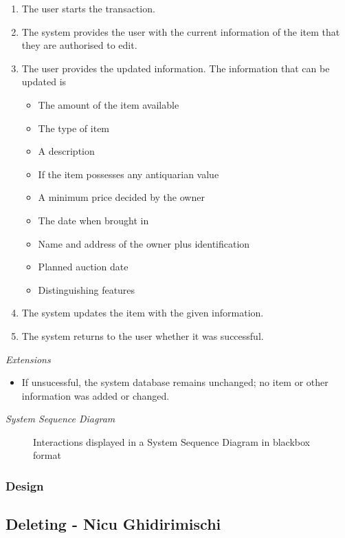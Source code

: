 \documentclass{article}
\begin{document}
\begin{enumerate}[noitemsep]
	\item The user starts the transaction.
	\item The system provides the user with the current information of the item that they are authorised to edit.
	\item The user provides the updated information. The information that can be updated is
	\begin{itemize}[noitemsep]
		\item The amount of the item available
		\item The type of item
		\item A description
		\item If the item possesses any antiquarian value
		\item A minimum price decided by the owner
		\item The date when brought in
		\item Name and address of the owner plus identification
		\item Planned auction date
		\item Distinguishing features
	\end{itemize}
	\item The system updates the item with the given information.
	\item The system returns to the user whether it was successful.
\end{enumerate}
\textsl{Extensions}
\begin{itemize}[noitemsep]
	\item If unsucessful, the system database remains unchanged; no item or other information was added or changed.
\end{itemize}
\textsl{System Sequence Diagram}
\begin{figure}[H]
	\centering
	\caption*{Interactions displayed in a System Sequence Diagram in blackbox format}
\end{figure}
\subsubsection*{Design}
\subsection*{Deleting - Nicu Ghidirimischi}
\end{document}
